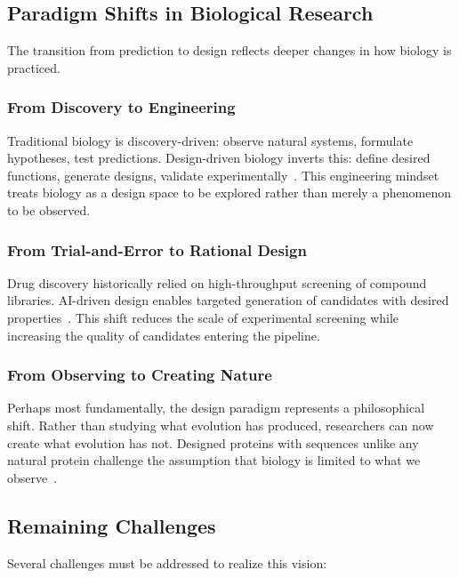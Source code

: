 \subsection{Paradigm Shifts in Biological Research}
\label{subsec:paradigm}

The transition from prediction to design reflects deeper changes in how biology is practiced.

\subsubsection{From Discovery to Engineering}

Traditional biology is discovery-driven: observe natural systems, formulate hypotheses, test predictions. Design-driven biology inverts this: define desired functions, generate designs, validate experimentally~\cite{bennett2024symmetric}. This engineering mindset treats biology as a design space to be explored rather than merely a phenomenon to be observed.

\subsubsection{From Trial-and-Error to Rational Design}

Drug discovery historically relied on high-throughput screening of compound libraries. AI-driven design enables targeted generation of candidates with desired properties~\cite{zambaldi2024alphaproteo}. This shift reduces the scale of experimental screening while increasing the quality of candidates entering the pipeline.

\subsubsection{From Observing to Creating Nature}

Perhaps most fundamentally, the design paradigm represents a philosophical shift. Rather than studying what evolution has produced, researchers can now create what evolution has not. Designed proteins with sequences unlike any natural protein challenge the assumption that biology is limited to what we observe~\cite{ingraham2023chroma}.

\subsection{Remaining Challenges}
\label{subsec:challenges_future}

Several challenges must be addressed to realize this vision:

